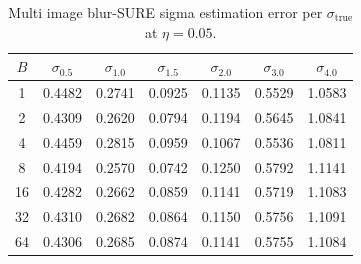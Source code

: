 \begin{table}[h]
\centering
\begin{tabular}{ccccccc}
\toprule
$B$ & $\sigma_{0.5}$ & $\sigma_{1.0}$ & $\sigma_{1.5}$ & $\sigma_{2.0}$ & $\sigma_{3.0}$ & $\sigma_{4.0}$ \\
\midrule
1 & 0.4482 & 0.2741 & 0.0925 & 0.1135 & 0.5529 & 1.0583 \\
2 & 0.4309 & 0.2620 & 0.0794 & 0.1194 & 0.5645 & 1.0841 \\
4 & 0.4459 & 0.2815 & 0.0959 & 0.1067 & 0.5536 & 1.0811 \\
8 & 0.4194 & 0.2570 & 0.0742 & 0.1250 & 0.5792 & 1.1141 \\
16 & 0.4282 & 0.2662 & 0.0859 & 0.1141 & 0.5719 & 1.1083 \\
32 & 0.4310 & 0.2682 & 0.0864 & 0.1150 & 0.5756 & 1.1091 \\
64 & 0.4306 & 0.2685 & 0.0874 & 0.1141 & 0.5755 & 1.1084 \\
\bottomrule
\end{tabular}
\caption{Multi image blur-SURE sigma estimation error per $\sigma_{\text{true}}$ at $\eta = 0.05$.}
\label{tab:multi_image_per_sigma}
\end{table}
